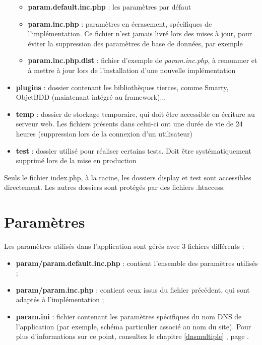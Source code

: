 \begin{itemize}
\begin{itemize}
\item \textbf{param.default.inc.php} : les paramètres par défaut
\item \textbf{param.inc.php} : paramètres en écrasement, spécifiques de l'implémentation. Ce fichier n'est jamais livré lors des mises à jour, pour éviter la suppression des paramètres de base de données, par exemple
\item \textbf{param.inc.php.dist} : fichier d'exemple de \textit{param.inc.php}, à renommer et à mettre à jour lors de l'installation d'une nouvelle implémentation
\end{itemize}
\item \textbf{plugins} : dossier contenant les bibliothèques tierces, comme Smarty, ObjetBDD (maintenant intégré au framework)...
\item \textbf{temp} : dossier de stockage temporaire, qui doit être accessible en écriture au serveur web. Les fichiers présents dans celui-ci ont une durée de vie de 24 heures (suppression lors de la connexion d'un utilisateur)
\item \textbf{test} : dossier utilisé pour réaliser certains tests. Doit être systématiquement supprimé lors de la mise en production
\end{itemize}

Seuls le fichier index.php, à la racine, les dossiers display et test sont accessibles directement. Les autres dossiers sont protégés par des fichiers .htaccess.

\section{Paramètres}\label{param}

Les paramètres utilisés dans l'application sont gérés avec 3 fichiers différents :
\begin{itemize}
\item \textbf{param/param.default.inc.php} : contient l'ensemble des paramètres utilisés ;
\item \textbf{param/param.inc.php} : contient ceux issus du fichier précédent, qui sont adaptés à l'implémentation ;
\item \textbf{param.ini} : fichier contenant les paramètres spécifiques du nom DNS de l'application (par exemple, schéma particulier associé au nom du site). Pour plus d'informations sur ce point, consultez le chapitre \ref{dnsmultiple} \textit{}, page \pageref{dnsmultiple}.
\end{itemize}

